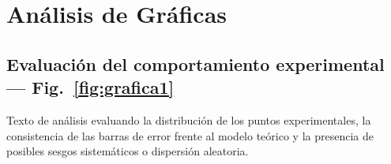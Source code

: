 
\section{Análisis de Gráficas}
\label{sec:analisis_graficas}

\subsection{Evaluación del comportamiento experimental --- Fig.~\ref{fig:grafica1}}

Texto de análisis evaluando la distribución de los puntos experimentales, la consistencia de las barras de error frente al modelo teórico y la presencia de posibles sesgos sistemáticos o dispersión aleatoria.

